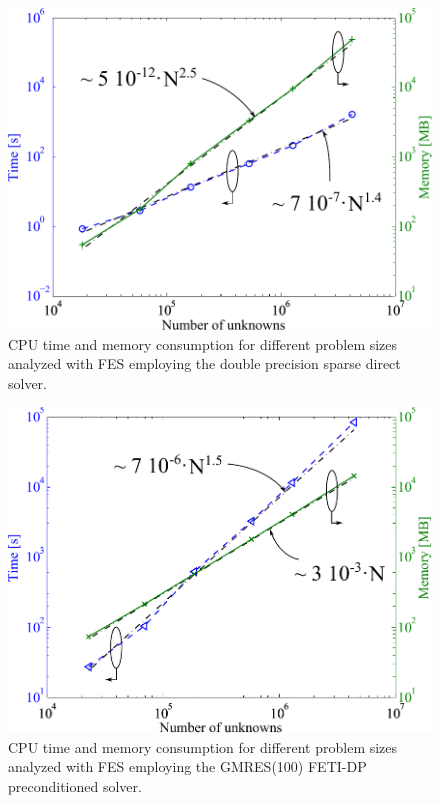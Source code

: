 \begin{figure}[h!]
\centering
\includegraphics[width=13.4cm]{DirectCompl}
\caption{CPU time and memory consumption for different problem sizes analyzed with FES employing the double precision sparse direct solver.}
\label{fig:DirectCompl}
\end{figure}

\begin{figure}[h!]
\centering
\includegraphics[width=13.4cm]{IterCompl}
\caption{CPU time and memory consumption for different problem sizes analyzed with FES employing the GMRES(100) FETI-DP preconditioned solver.}
\label{fig:IterCompl}
\end{figure}


